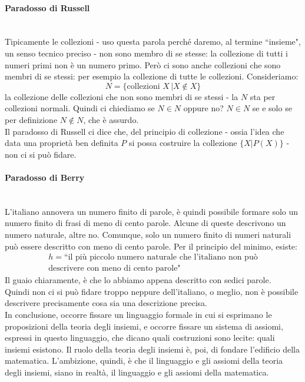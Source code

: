 \paragraph*{Paradosso di Russell}\mbox{}\\
Tipicamente le collezioni - uso questa parola perché daremo, al termine ``insieme", un senso tecnico preciso - non sono membro di se stesse: la collezione di 
tutti i numeri primi non è un numero primo. Però ci sono anche collezioni che sono membri di se stessi: per esempio la collezione di tutte le collezioni. Consideriamo:
\[ N = \{\text{collezioni $X$}\, | X \not\in X \}
	\]
la collezione delle collezioni che non sono membri di se stessi - la $N$ sta per collezioni normali. Quindi ci chiediamo se $N \in N$ oppure no? $N \in N$ se e solo se per definizione $N \not \in N$, che è assurdo.\\
Il paradosso di Russell ci dice che, del principio di collezione - ossia l'idea che data una proprietà ben definita $P$ si possa costruire la collezione $\{X | P(X)\}$ - non ci si può fidare.

\paragraph*{Paradosso di Berry}\mbox{}\\
L'italiano annovera un numero finito di parole, è quindi possibile formare solo un numero finito di frasi di meno di cento parole. Alcune di queste descrivono un numero naturale, altre no. Comunque, solo un numero 
finito di numeri naturali può essere descritto con meno di cento parole. Per il principio del minimo, esiste:
\begin{align*}
	h = \text{``il più piccolo numero naturale che l'italiano non può} \\ 
 \text{descrivere con meno di cento parole"}
\end{align*}
Il guaio chiaramente, è che lo abbiamo appena descritto con sedici parole.\\
Quindi non ci si può fidare troppo neppure dell'italiano, o meglio, non è possibile descrivere precisamente cosa sia una descrizione precisa.\\
In conclusione, occorre fissare un linguaggio formale in cui si esprimano le proposizioni della teoria degli insiemi, e occorre fissare un sistema di assiomi, espressi in questo linguaggio, che 
dicano quali costruzioni sono lecite: quali insiemi esistono. Il ruolo della teoria degli insiemi è, poi, di fondare l'edificio della matematica. L'ambizione, quindi, è che il linguaggio e gli assiomi della teoria degli insiemi, 
siano in realtà, il linguaggio e gli assiomi della matematica.

